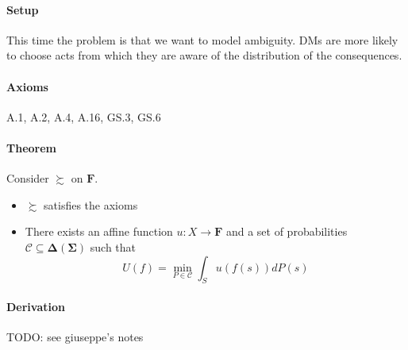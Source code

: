 \documentclass[14pt]{extarticle}
\begin{document}
\paragraph{Setup}
This time the problem is that we want to model ambiguity.
DMs are more likely to choose acts from which they are aware
of the distribution of the consequences.

\paragraph{Axioms} A.1, A.2, A.4, A.16, GS.3, GS.6

\paragraph{Theorem}
Consider $\succsim$ on $\bm F$.
\begin{itemize}
	\item $\succsim$ satisfies the axioms
	\item There exists an affine function	$u: X \to \bm F$
	      and a set of probabilities $\mathcal C \subseteq \bm \Delta(\bm \Sigma)$
	      such that
	      \[
		      U(f) = \min_{P\in \mathcal C} \int_S u(f(s)) dP(s)
	      \]
\end{itemize}

\paragraph{Derivation}
TODO: see giuseppe's notes
\end{document}
